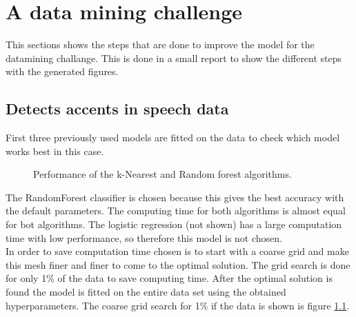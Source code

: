 \documentclass[a4paper,12pt]{article}
\begin{document}

\tableofcontents %

\section{A data mining challenge}
This sections shows the steps that are done to improve the model for the datamining challange. This is done in a small report to show the different steps with the generated figures. 

\subsection{Detects accents in speech data}
First three previously used models are fitted on the data to check which model works best in this case.

\begin{figure}[H]
\hfill
{}
\hfill
\caption{Performance of the k-Nearest and Random forest algorithms. }
\label{Q41a}
\end{figure}

The RandomForest classifier is chosen because this gives the best accuracy with the default parameters. The computing time for both algorithms is almost equal for bot algorithms. The logistic regression (not shown) has a large computation time with low performance, so therefore this model is not chosen. \\
In order to save computation time chosen is to start with a coarse grid and make this mesh finer and finer to come to the optimal solution. The grid search is done for only 1\% of the data to save computing time. After the optimal solution is found the model is fitted on the entire data set using the obtained hyperparameters. The coarse grid search for 1\% if the data is shown is figure \ref{}. 
\end{document}
